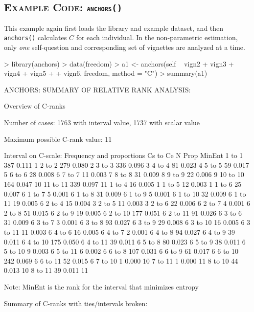 \documentclass{amsart}
\newcommand{\code}[1]{{\texttt{#1}}}
\newcommand{\ssubsection}[2]{%
  \subsection[#1]{\normalfont\scshape #1: {\tt #2}}}
\begin{document}
\ssubsection{Example Code}{anchors()}
This example again first loads the library and example dataset, and
then \code{anchors()} calculates $C$ for each individual.  In the
non-parametric estimation, only \emph{one} self-question and
corresponding set of vignettes are analyzed at a time.
\begin{Schunk}
\begin{Sinput}
> library(anchors)
> data(freedom)
> a1 <- anchors(self ~ vign2 + vign3 + vign4 + vign5 + 
+     vign6, freedom, method = "C")
> summary(a1)
\end{Sinput}
\begin{Soutput}
ANCHORS: SUMMARY OF RELATIVE RANK ANALYSIS:

Overview of C-ranks

Number of cases: 1763 with interval value, 1737 with scalar value

Maximum possible C-rank value: 11

Interval on C-scale: Frequency and proportions Cs to Ce
           N  Prop MinEnt
 1 to  1 387 0.111      1
 2 to  2 279 0.080      2
 3 to  3 336 0.096      3
 4 to  4  81 0.023      4
 5 to  5  59 0.017      5
 6 to  6  28 0.008      6
 7 to  7  11 0.003      7
 8 to  8  31 0.009      8
 9 to  9  22 0.006      9
10 to 10 164 0.047     10
11 to 11 339 0.097     11
 1 to  4  16 0.005      1
 1 to  5  12 0.003      1
 1 to  6  25 0.007      6
 1 to  7   5 0.001      6
 1 to  8  31 0.009      6
 1 to  9   5 0.001      6
 1 to 10  32 0.009      6
 1 to 11  19 0.005      6
 2 to  4  15 0.004      3
 2 to  5  11 0.003      3
 2 to  6  22 0.006      6
 2 to  7   4 0.001      6
 2 to  8  51 0.015      6
 2 to  9  19 0.005      6
 2 to 10 177 0.051      6
 2 to 11  91 0.026      6
 3 to  6  31 0.009      6
 3 to  7   3 0.001      6
 3 to  8  93 0.027      6
 3 to  9  29 0.008      6
 3 to 10  16 0.005      6
 3 to 11  11 0.003      6
 4 to  6  16 0.005      6
 4 to  7   2 0.001      6
 4 to  8  94 0.027      6
 4 to  9  39 0.011      6
 4 to 10 175 0.050      6
 4 to 11  39 0.011      6
 5 to  8  80 0.023      6
 5 to  9  38 0.011      6
 5 to 10   9 0.003      6
 5 to 11   6 0.002      6
 6 to  8 107 0.031      6
 6 to  9  61 0.017      6
 6 to 10 242 0.069      6
 6 to 11  52 0.015      6
 7 to 10   1 0.000     10
 7 to 11   1 0.000     11
 8 to 10  44 0.013     10
 8 to 11  39 0.011     11

Note: MinEnt is the rank for the interval that minimizes entropy

Summary of C-ranks with ties/intervals broken:


\end{Soutput}
\end{Schunk}
\end{document}

